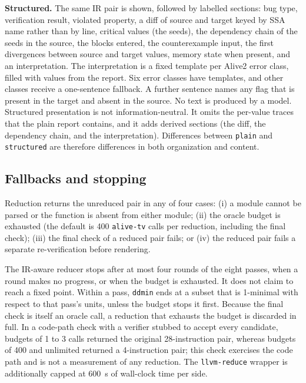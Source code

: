 \documentclass[conference]{IEEEtran}
\newcommand{\cn}[1]{\texttt{#1}}   %
\begin{document}
\textbf{Structured.} The same IR pair is shown, followed by labelled sections: bug type, verification result, violated property, a diff of source and target keyed by SSA name rather than by line, critical values (the seeds), the dependency chain of the seeds in the source, the blocks entered, the counterexample input, the first divergences between source and target values, memory state when present, and an interpretation. The interpretation is a fixed template per Alive2 error class, filled with values from the report. Six error classes have templates, and other classes receive a one-sentence fallback. A further sentence names any flag that is present in the target and absent in the source. No text is produced by a model. Structured presentation is not information-neutral. It omits the per-value traces that the plain report contains, and it adds derived sections (the diff, the dependency chain, and the interpretation). Differences between \cn{plain} and \cn{structured} are therefore differences in both organization and content.

\subsection{Fallbacks and stopping}

Reduction returns the unreduced pair in any of four cases: (i) a module cannot be parsed or the function is absent from either module; (ii) the oracle budget is exhausted (the default is 400 \texttt{alive-tv} calls per reduction, including the final check); (iii) the final check of a reduced pair fails; or (iv) the reduced pair fails a separate re-verification before rendering.

The IR-aware reducer stops after at most four rounds of the eight passes, when a round makes no progress, or when the budget is exhausted. It does not claim to reach a fixed point. Within a pass, \texttt{ddmin} ends at a subset that is 1-minimal with respect to that pass's units, unless the budget stops it first. Because the final check is itself an oracle call, a reduction that exhausts the budget is discarded in full. In a code-path check with a verifier stubbed to accept every candidate, budgets of 1 to 3 calls returned the original 28-instruction pair, whereas budgets of 400 and unlimited returned a 4-instruction pair; this check exercises the code path and is not a measurement of any reduction. The \texttt{llvm-reduce} wrapper is additionally capped at 600~s of wall-clock time per side.

\end{document}

